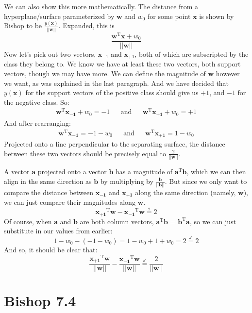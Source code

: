 \documentclass[11pt]{report}
\begin{document}
We can also show this more mathematically. The distance from a hyperplane/surface parameterized by $\mathbf{w}$ and $w_0$ for some point $\mathbf{x}$ is shown by Bishop to be $\frac{y(\mathbf{x})}{||\mathbf{w}||}$. Expanded, this is
\[
  \frac{\mathbf{w}^\text{T}\mathbf{x} + w_0}{||\mathbf{w}||}
\]
Now let's pick out two vectors, $\mathbf{x}_{-1}$ and $\mathbf{x}_{+1}$, both of which are subscripted by the class they belong to. We know we have at least these two vectors, both support vectors, though we may have more. We can define the magnitude of $\mathbf{w}$ however we want, as was explained in the last paragraph. And we have decided that $y(\mathbf{x})$ for the support vectors of the positive class should give us $+1$, and $-1$ for the negative class. So:
\begin{align*}
  \mathbf{w}^\text{T}\mathbf{x_{-1}} + w_0 = -1
  & &
  \text{and}
  & &
  \mathbf{w}^\text{T}\mathbf{x_{+1}} + w_0 = +1
\end{align*}
And after rearranging:
\begin{align*}
  \mathbf{w}^\text{T}\mathbf{x_{-1}} = -1 - w_0
  & &
  \text{and}
  & &
  \mathbf{w}^\text{T}\mathbf{x_{+1}} = 1 - w_0
\end{align*}
Projected onto a line perpendicular to the separating surface, the distance between these two vectors should be precisely equal to $\frac{2}{||\mathbf{w}||}$.

A vector $\mathbf{a}$ projected onto a vector $\mathbf{b}$ has a magnitude of $\mathbf{a}^\text{T}\mathbf{b}$, which we can then align in the same direction as $\mathbf{b}$ by multiplying by $\frac{\mathbf{b}}{||\mathbf{b}||}$. But since we only want to compare the distance between $\mathbf{x_{-1}}$ and $\mathbf{x_{+1}}$ along the same direction (namely, $\mathbf{w}$), we can just compare their magnitudes along $\mathbf{w}$.
\[
  \mathbf{x_{+1}}^\text{T}\mathbf{w} - \mathbf{x_{-1}}^\text{T}\mathbf{w} \overset{?}{=} 2
\]
Of course, when $\mathbf{a}$ and $\mathbf{b}$ are both column vectors, $\mathbf{a}^\text{T}\mathbf{b}$ = $\mathbf{b}^\text{T}\mathbf{a}$, so we can just substitute in our values from earlier:
\[
  1 - w_0 - (-1 - w_0) = 1 - w_0 + 1 + w_0 = 2 \overset{\checkmark}{=} 2
\]
And so, it should be clear that:
\[
  \frac{\mathbf{x_{+1}}^\text{T}\mathbf{w}}{||\mathbf{w}||} - \frac{\mathbf{x_{-1}}^\text{T}\mathbf{w}}{||\mathbf{w}||} \overset{\checkmark}{=} \frac{2}{||\mathbf{w}||}
\]

\section{Bishop 7.4}
\end{document}
